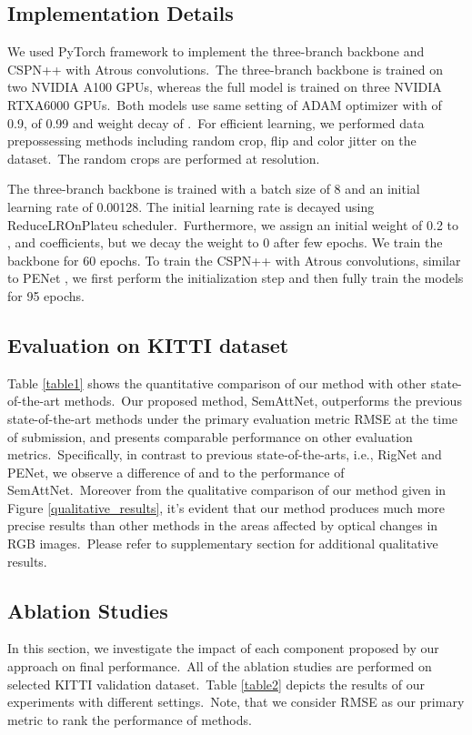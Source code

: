 \documentclass{ieeeaccess}
\begin{document}
\subsection{Implementation Details}


We used PyTorch \cite{PyTorch} framework to implement the three-branch backbone and CSPN++ with Atrous convolutions.~The three-branch backbone is trained on two NVIDIA A100 GPUs, whereas the full model is trained on three NVIDIA RTXA6000 GPUs.~Both models use same setting of ADAM optimizer \cite{kingma2017adam} with  of  0.9,  of 0.99 and weight decay of .~For efficient learning, we performed data prepossessing methods including random crop, flip and color jitter \cite{ma2018sparse} on the dataset.~The random crops are performed at  resolution. 

 The three-branch backbone is trained with a batch size of 8 and an initial learning rate of 0.00128. The initial learning rate is decayed using ReduceLROnPlateu scheduler.~Furthermore, we assign an initial weight of 0.2 to  ,  and  coefficients, but we decay the weight to 0 after few epochs. We train the backbone for 60 epochs. To train the CSPN++ with Atrous convolutions, similar to PENet \cite{hu2020PENet}, we first perform the initialization step and then fully train the models for 95 epochs.

\subsection{Evaluation on KITTI dataset}
Table \ref{table1} shows the quantitative comparison of our method with other state-of-the-art methods.~Our proposed method, SemAttNet, outperforms the previous state-of-the-art methods under the primary evaluation metric RMSE at the time of submission, and presents comparable performance on other evaluation metrics.~Specifically, in contrast to previous state-of-the-arts, i.e., RigNet and PENet, we observe a difference of  and  to the performance of SemAttNet.~Moreover from the qualitative comparison of our method given in Figure \ref{qualitative_results}, it's evident that our method produces much more precise results than other methods in the areas affected by optical changes in RGB images.~Please refer to supplementary section for additional qualitative results.

\subsection{Ablation Studies}
In this section, we investigate the impact of each component proposed by our approach on final performance.~All of the ablation studies are performed on selected KITTI validation dataset.~Table \ref{table2} depicts the results of our experiments with different settings.~Note, that we consider RMSE as our primary metric to rank the performance of methods.
\end{document}

